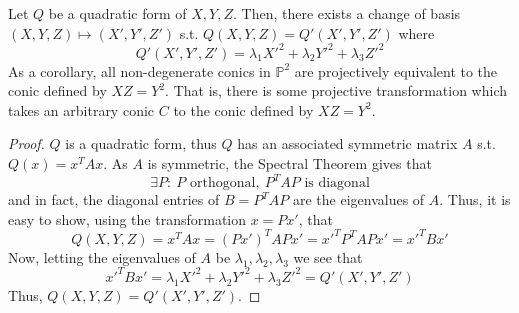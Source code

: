 \begin{theorem}
Let $Q$ be a quadratic form of $X, Y, Z$. Then, there exists a change of basis $(X,Y,Z) \mapsto (X',Y',Z')$ s.t.
$Q(X,Y,Z) = Q'(X',Y',Z')$ where
\[
Q'(X',Y',Z') = \lambda_1 X'^2 + \lambda_2 Y'^2 + \lambda_3 Z'^2
\]
As a corollary, all non-degenerate conics in $\mathbb{P}^2$ are projectively
equivalent to the conic defined by $XZ = Y^2$. That is, there is some
projective transformation which takes an arbitrary conic $C$ to the conic 
defined by $XZ = Y^2$.
\end{theorem}
\begin{proof}
$Q$ is a quadratic form,
thus $Q$ has an associated symmetric matrix 
$A$ s.t. $Q(x) = x^TAx$. As $A$ is symmetric, the Spectral Theorem gives that
\[
\exists P:~P\text{ orthogonal},~P^TAP\text{ is diagonal}
\]
and in fact, the diagonal entries of $B=P^TAP$ are the eigenvalues of $A$. Thus,
it is easy to show, using the transformation $x=Px'$, that
\[
Q(X,Y,Z) = x^TAx = (Px')^TAPx' = x'^TP^TAPx' = x'^TBx'
\]
Now, letting the eigenvalues of $A$ be $\lambda_1, \lambda_2, \lambda_3$ we see that
\[
x'^TBx' = \lambda_1 X'^2 + \lambda_2 Y'^2 + \lambda_3 Z'^2 = Q'(X',Y',Z')
\]
Thus, $Q(X,Y,Z) = Q'(X',Y',Z')$.
\end{proof}
